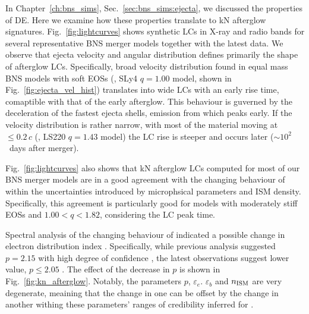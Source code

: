In Chapter~\ref{ch:bns_sims}, Sec.~\ref{sec:bns_sims:ejecta}, we discussed the properties of \ac{DE}. Here we examine how these properties translate to \ac{kN} 
afterglow signatures. 
%
Fig.~\ref{fig:lightcurves} shows synthetic \acp{LC} in X-ray and radio bands 
for several representative \ac{BNS} merger models together with the latest 
\GRB{} data. 
We observe that ejecta velocity and angular distribution defines primarily the shape of 
afterglow \acp{LC}. 
Specifically, broad velocity distribution found in equal mass \ac{BNS} models 
with soft \acp{EOS} (\eg, SLy4 $q=1.00$ model, shown in Fig.~\ref{fig:ejecta_vel_hist}) 
translates into wide \acp{LC} with an early rise time, comaptible with that of the early \GRB{} afterglow. 
This behaviour is guverned by the deceleration of the fastest ejecta shells, 
emission from which peaks early. If the velocity distribution is rather narrow, with most of the 
material moving at ${\leq}0.2\,c$ (\eg, LS220 $q=1.43$ model) 
the \ac{LC} rise is steeper and occurs later (${\sim}10^2$~days after merger). 

Fig.~\ref{fig:lightcurves} also shows that \ac{kN} afterglow \acp{LC} computed 
for most of our \ac{BNS} merger models are in a good agreement with the 
changing behaviour of \GRB{} within the uncertainties introduced by microphsical 
parameters and \ac{ISM} density.
%
Specifically, this agreement is particularly good for models with moderately stiff 
\acp{EOS} and $1.00<q<1.82$, considering the \ac{LC} peak time.

Spectral analysis of the changing behaviour of \GRB{} indicated a possible 
change in electron distribution index \citep{Hajela:2021faz}. Specifically, 
while previous \GRB{} analysis suggested $p=2.15$ with high degree of confidence 
\citep[\eg][]{Hajela:2019mjy}, the latest observations suggest lower value, 
$p\leq2.05$ \citep{Hajela:2021faz}. 
%
The effect of the decrease in $p$ is shown in 
Fig.~\ref{fig:kn_afterglow}. Notably, the parameters $p$, $\varepsilon_e$. $\varepsilon_b$ and 
$n_{\text{ISM}}$ are very degenerate, meaining that the change in one can be offset by the change in 
another withing these parameters' ranges of credibility inferred for \GRB{}. 

